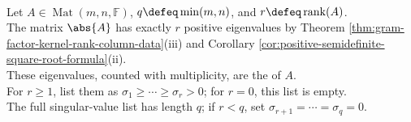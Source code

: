 \begin{definition} \label{def:matrix-singular-values} \\
Let $A\in\operatorname{Mat}(m,n,\mathbb{F})$, $q\defeq\min(m,n)$, and $r\defeq\operatorname{rank}(A)$.\\
The matrix $\abs{A}$ has exactly $r$ positive eigenvalues by Theorem \ref{thm:gram-factor-kernel-rank-column-data}(iii) and Corollary \ref{cor:positive-semidefinite-square-root-formula}(ii).\\
These eigenvalues, counted with multiplicity, are the  of $A$.\\
For $r\geq1$, list them as $\sigma_1\geq\cdots\geq\sigma_r>0$; for $r=0$, this list is empty.\\
The full singular-value list has length $q$; if $r<q$, set $\sigma_{r+1}=\cdots=\sigma_q=0$.
\end{definition}

